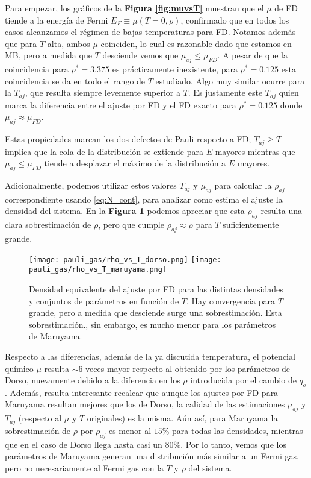 Para empezar, los gráficos de la \textbf{Figura \ref{fig:muvsT}} muestran que el $\mu$ de FD tiende a la energía de Fermi $E_F\equiv \mu(T=0,\rho)$,
confirmado que en todos los casos alcanzamos el régimen de bajas temperaturas para FD.
Notamos además que para $T$ alta, ambos $\mu$ coinciden, lo cual es razonable dado que estamos en MB, pero a medida que $T$ desciende vemos que $\mu_{aj}\leq\mu_{FD}$.
A pesar de que la coincidencia para $\rho^*=3.375$ es prácticamente inexistente, para $\rho^*=0.125$ esta coincidencia se da en todo el rango de $T$ estudiado.
Algo muy similar ocurre para la $T_{aj}$, que resulta siempre levemente superior a $T$.
Es justamente este $T_{aj}$ quien marca la diferencia entre el ajuste por FD y el FD exacto para $\rho^*=0.125$ donde $\mu_{aj}\approx\mu_{FD}$.

Estas propiedades marcan los dos defectos de Pauli respecto a FD; $T_{aj}\geq T$ implica que la cola de la distribución se extiende para $E$ mayores mientras que $\mu_{aj}\leq\mu_{FD}$ tiende a
desplazar el máximo de la distribución a $E$ mayores.

Adicionalmente, podemos utilizar estos valores $T_{aj}$ y $\mu_{aj}$ para calcular la $\rho_{aj}$ correspondiente usando \eqref{eq:N_cont}, para analizar como estima el ajuste la densidad del sistema.
En la \textbf{Figura \ref{fig:rhovsT}} podemos apreciar que esta $\rho_{aj}$ resulta una clara sobrestimación de $\rho$, pero que cumple $\rho_{aj}\approx\rho$ para $T$ suficientemente grande.

\begin{figure}[H]
	\centering
	\texttt{[image: pauli\_gas/rho\_vs\_T\_dorso.png]}
	\texttt{[image: pauli\_gas/rho\_vs\_T\_maruyama.png]}
	\caption{Densidad equivalente del ajuste por FD para las distintas densidades y conjuntos de parámetros en función de $T$.
	Hay convergencia para $T$ grande, pero a medida que desciende surge una sobrestimación.
	Esta sobrestimación., sin embargo, es mucho menor para los parámetros de Maruyama.}
	\label{fig:rhovsT}
\end{figure}

Respecto a las diferencias, además de la ya discutida temperatura, el potencial químico $\mu$ resulta $\sim 6$ veces mayor respecto al obtenido por los parámetros de Dorso, nuevamente
debido a la diferencia en los $\rho$ introducida por el cambio de $q_o$.
Además, resulta interesante recalcar que aunque los ajustes por FD para Maruyama resultan mejores que los de Dorso, la calidad de las estimaciones $\mu_{aj}$ y $T_{aj}$
(respecto al $\mu$ y $T$ originales) es la misma.
Aún así, para Maruyama la sobrestimación de $\rho$ por $\rho_{aj}$ es menor al $15\%$ para todas las densidades, mientras que en el caso de Dorso llega hasta casi un $80\%$.
Por lo tanto, vemos que los parámetros de Maruyama generan una distribución más similar a un Fermi gas, pero no necesariamente al Fermi gas con la $T$ y $\rho$ del sistema.

